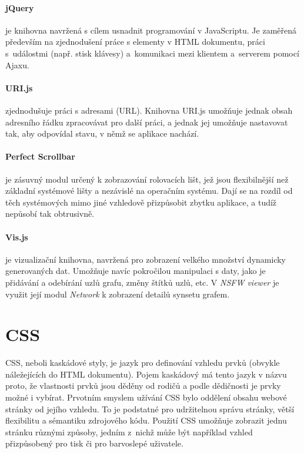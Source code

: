 \documentclass[a4paper, 11pt, oneside]{book}
\newcommand{\simplywn}{\textit{NSFW viewer} }
\begin{document}
					\paragraph{jQuery} je knihovna navržená s cílem usnadnit programování v JavaScriptu. Je zaměřená především na zjednodušení práce s elementy v HTML dokumentu, práci s~událostmi (např. stisk klávesy) a~komunikaci mezi klientem a~serverem pomocí Ajaxu. \parencite{jqueryWeb}

					\paragraph{URI.js} zjednodušuje práci s adresami (URL). Knihovna URI.js umožňuje jednak obsah adresního řádku zpracovávat pro další práci, a jednak jej umožňuje nastavovat tak, aby odpovídal stavu, v němž se aplikace nachází. \parencite{urijsWeb}

					\paragraph{Perfect Scrollbar} je zásuvný modul určený k zobrazování rolovacích lišt, jež jsou flexibilnější než základní systémové lišty a nezávislé na operačním systému. Dají se na rozdíl od těch systémových mimo jiné vzhledově přizpůsobit zbytku aplikace, a tudíž nepůsobí tak obtrusivně. \parencite{perfectScrollbarGithub}

					\paragraph{Vis.js} je vizualizační knihovna, navržená pro zobrazení velkého množství dynamicky generovaných dat. Umožňuje navíc pokročilou manipulaci s daty, jako je přidávání a odebírání uzlů grafu, změny štítků uzlů, etc. V \simplywn je využit její modul \textit{Network} k zobrazení detailů synsetu grafem. \parencite{visjWeb}

			\section{CSS}

				CSS, neboli kaskádové styly, je jazyk pro definování vzhledu prvků (obvykle náležejících do HTML dokumentu). Pojem kaskádový má tento jazyk v názvu proto, že vlastnosti prvků jsou děděny od rodičů a podle dědičnosti je prvky možné i vybírat. Prvotním smyslem užívání CSS bylo oddělení obsahu webové stránky od jejího vzhledu. To je podstatné pro udržitelnou správu stránky, větší flexibilitu a sémantiku zdrojového kódu. Použití CSS umožňuje zobrazit jednu stránku různými způsoby, jedním z~nichž může být například vzhled přizpůsobený pro tisk či pro barvoslepé uživatele.
\end{document}
